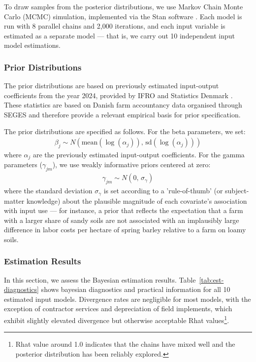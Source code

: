 \documentclass[12pt]{article}
\begin{document}
To draw samples from the posterior distributions, we use Markov Chain
Monte Carlo (MCMC) simulation, implemented via the Stan software
\citep{Carpenter2017, stan2025}.
Each model is run with 8 parallel chains and 2,000 iterations, and
each input variable is estimated as a separate model --- that is, we
carry out 10 independent input model estimations.

\subsubsection{Prior Distributions}
The prior distributions are based on
previously estimated input-output coefficients from the year 2024, provided by IFRO and Statistics Denmark \citep{henningsen2026, dst2025a}.
These statistics are based on Danish farm accountancy data organised through SEGES and therefore provide a relevant empirical basis for prior specification.

The prior distributions are specified as follows.
For the beta parameters, we set:
\begin{align}
    \beta_j \sim N\!\left(
    \text{mean}(\log(\alpha_j)),\,
    \text{sd}(\log(\alpha_j))
    \right)
\end{align}
where $\alpha_j$ are the previously estimated input-output coefficients.
For the gamma parameters ($\gamma_{jm}$), we use weakly informative priors centered at
zero:
\begin{align}
    \gamma_{jm} \sim N(0,\, \sigma_{\gamma})
\end{align}
where the standard deviation $\sigma_{\gamma}$ is set according to a 'rule-of-thumb' (or subject-matter knowledge) about the plausible magnitude of each covariate's association with input use --- for instance, a prior that reflects the expectation that a farm with a larger share of sandy soils are not associated with an implausibly large difference in labor costs per hectare of spring barley relative to a farm on loamy soils.


\subsubsection{Estimation Results}
In this section, we assess the Bayesian estimation results.
Table~\ref{tab:est-diagnostics} shows bayesian diagnostics and practical information for all 10 estimated input models.
Divergence rates are negligible for most models, with the exception of contractor services and depreciation of field implements, which exhibit slightly elevated divergence but otherwise acceptable Rhat values\footnote{Rhat value around 1.0 indicates that the chains have mixed well and the 
posterior distribution has been reliably explored.}.
\end{document}
